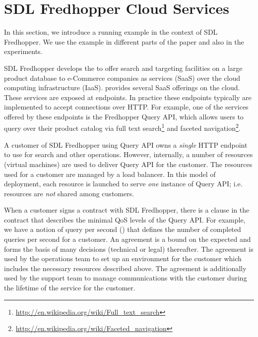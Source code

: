 
\section{SDL Fredhopper Cloud Services} %
\label{sec:fredhopper_example}

In this section, we introduce a running example in the context of SDL Fredhopper. 
We use the example in different parts of the paper and also in the experiments.

SDL Fredhopper develops the \frhcsp to offer search and targeting facilities on a large product database to e-Commerce companies as services (SaaS) over the cloud computing infrastructure (IaaS).  
\frhcsp provides several SaaS offerings on the cloud. 
These services are exposed at endpoints. 
In practice these endpoints typically are implemented to accept connections over HTTP.
For example, one of the services offered by these endpoints is the Fredhopper Query API, which allows users to query over their product catalog via full text search\footnote{\url{http://en.wikipedia.org/wiki/Full_text_search}} and faceted navigation\footnote{\url{http://en.wikipedia.org/wiki/Faceted_navigation}}.

A customer of SDL Fredhopper using Query API owns a \emph{single} HTTP endpoint to use for search and other operations.
However, internally, a number of resources (virtual machines) are used to deliver Query API for the customer.
The %
resources used for a customer are managed by a load balancer.
In this model of deployment, each resource is launched to serve \emph{one} instance of Query API; i.e. resources are \emph{not} shared among customers.

When a customer signs a contract with SDL Fredhopper, there is a clause in the contract that describes the minimal QoS levels of the
Query API.
For example, we have a notion of query per second (\qps) that defines the number of completed queries per second for a customer. 
An agreement is a bound on the expected \qps and forms
the basis of many decisions (technical or legal) thereafter. 
The agreement is used by the operations team to set up an environment for the customer which includes the necessary resources described above.
The agreement is additionally used by the support team to manage communications with the customer during the lifetime of the service for the customer.
% 

